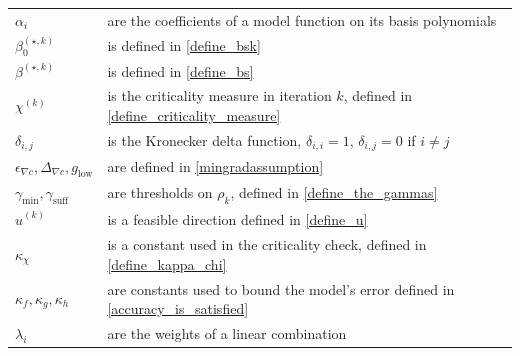 \documentclass{article}
\theoremstyle{case}
\numberwithin{theorem}{subsection}
\newcommand{\bs}{{\beta^{(\star, k)}}}
\newcommand{\bsk}{{\beta_0^{(\star, k)}}}
\newcommand{\chik}{{\chi^{(k)}}}
\newcommand{\gammabi}{\gamma_{\textrm{suff}}}
\newcommand{\gammasm}{\gamma_{\textrm{min}}}
\newcommand{\huk}{{{\hat u}^{(k)}}}
\newcommand{\mingraddelta}{{\Delta_{\nabla c}}}
\newcommand{\mingradepsilon}{{\epsilon_{\nabla c}}}
\newcommand{\mingrad}{{ g_{\textrm{low}} }}
\newcommand{\rk}{\rho_k}
\begin{document}
\begin{longtable}{| p{} | p{} |}
$\alpha_i$ & are the coefficients of a model function on its basis polynomials \\ %
$\bsk $ & is defined in \cref{define_bsk} \\ %
$\bs $ & is defined in \cref{define_bs} \\ %
$\chik$ & is the criticality measure in iteration $k$, defined in \cref{define_criticality_measure} \\ %
$\delta_{i,j}$ & is the Kronecker delta function, $\delta_{i,i} = 1$, $\delta_{i,j} = 0$ if $i\ne j$ \\ %
$\mingradepsilon, \mingraddelta, \mingrad$ & are defined in \cref{mingradassumption} \\ %
$\gammasm,\gammabi$ & are thresholds on $\rk$, defined in \cref{define_the_gammas} \\ %
$\huk$ & is a feasible direction defined in \cref{define_u} \\ %
$\kappa_{\chi}$ & is a constant used in the criticality check, defined in \cref{define_kappa_chi} \\ %
$\kappa_{f},\kappa_{g},\kappa_{h}$ & are constants used to bound the model's error defined in \cref{accuracy_is_satisfied} \\ %
$\lambda_i$ & are the weights of a linear combination \\ %

\end{longtable}
\end{document}
